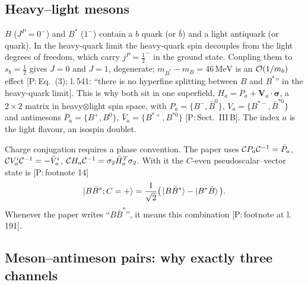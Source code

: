 \documentclass[11pt,a4paper]{article}
\newcommand{\tagP}[1]{\textcolor{blue!65!black}{\textsf{\small[P:\,#1]}}}
\newcommand{\MeV}{\,\mathrm{MeV}}
\begin{document}
\subsection{Heavy--light mesons}
\label{sec:qn-B}

$B$ ($J^P=0^-$) and $B^*$ ($1^-$) contain a $b$ quark (or $\bar b$) and a light antiquark (or quark). In the heavy-quark limit the heavy-quark spin decouples from the light degrees of freedom, which carry $j^P=\frac12^-$ in the ground state. Coupling them to $s_b=\frac12$ gives $J=0$ and $J=1$, degenerate; $m_{B^*}-m_B=46\MeV$ is an ${\cal O}(1/m_b)$ effect \tagP{Eq.~(3); l.\,541: ``there is no hyperfine splitting between $B$ and $B^*$'' in the heavy-quark limit}. This is why both sit in one superfield, $H_a=P_a+\bm V_a\cdot\bm\sigma$, a $2\times2$ matrix in heavy$\otimes$light spin space, with $P_a=\{B^-,\bar B^0\}$, $V_a=\{B^{*-},\bar B^{*0}\}$ and antimesons $\bar P_a=\{B^+,B^0\}$, $\bar V_a=\{B^{*+},B^{*0}\}$ \tagP{Sect.~III\,B}. The index $a$ is the light flavour, an isospin doublet.

Charge conjugation requires a phase convention. The paper uses ${\cal C}P_a{\cal C}^{-1}=\bar P_a$, ${\cal C}V_a^i{\cal C}^{-1}=-\bar V_a^i$, ${\cal C}H_a{\cal C}^{-1}=\sigma_2\bar H_a^T\sigma_2$. With it the $C$-even pseudoscalar--vector state is \tagP{footnote 14}
\begin{equation}
\ket{B\bar B^*;C=+}=\frac{1}{\sqrt2}\big(\ket{B\bar B^*}-\ket{B^*\bar B}\big).
\end{equation}
Whenever the paper writes ``$B\bar B^*$'', it means this combination \tagP{footnote at l.\,191}.

\subsection{Meson--antimeson pairs: why exactly three channels}
\label{sec:qn-pairs}
\end{document}
